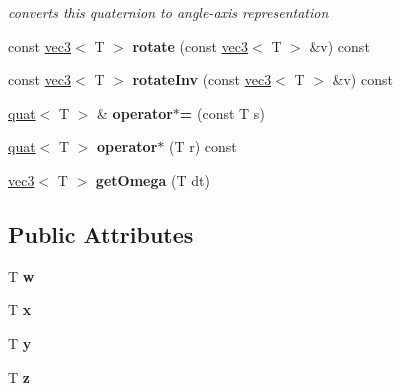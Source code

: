 \begin{DoxyCompactItemize}
\begin{DoxyCompactList}\small\item\em converts this quaternion to angle-\/axis representation \item\end{DoxyCompactList}\item 
\hypertarget{classmath_1_1quat_a2435a22376cf5c74aa3e9bf45cbfb0be}{
const \hyperlink{classmath_1_1vec3}{vec3}$<$ T $>$ {\bfseries rotate} (const \hyperlink{classmath_1_1vec3}{vec3}$<$ T $>$ \&v) const }
\label{classmath_1_1quat_a2435a22376cf5c74aa3e9bf45cbfb0be}

\item 
\hypertarget{classmath_1_1quat_ad8945faa17ebc4eb51175015336fb090}{
const \hyperlink{classmath_1_1vec3}{vec3}$<$ T $>$ {\bfseries rotateInv} (const \hyperlink{classmath_1_1vec3}{vec3}$<$ T $>$ \&v) const }
\label{classmath_1_1quat_ad8945faa17ebc4eb51175015336fb090}

\item 
\hypertarget{classmath_1_1quat_a4000ef6a410644de9ceb2173ecec0c10}{
\hyperlink{classmath_1_1quat}{quat}$<$ T $>$ \& {\bfseries operator$\ast$=} (const T s)}
\label{classmath_1_1quat_a4000ef6a410644de9ceb2173ecec0c10}

\item 
\hypertarget{classmath_1_1quat_ac2d729a5ae4a0f174ca48c380ec0b3a9}{
\hyperlink{classmath_1_1quat}{quat}$<$ T $>$ {\bfseries operator$\ast$} (T r) const }
\label{classmath_1_1quat_ac2d729a5ae4a0f174ca48c380ec0b3a9}

\item 
\hypertarget{classmath_1_1quat_a86bc81aaca830d5f1b48abf3b6ea2d65}{
\hyperlink{classmath_1_1vec3}{vec3}$<$ T $>$ {\bfseries getOmega} (T dt)}
\label{classmath_1_1quat_a86bc81aaca830d5f1b48abf3b6ea2d65}

\end{DoxyCompactItemize}
\subsection*{Public Attributes}
\begin{DoxyCompactItemize}
\item 
\hypertarget{classmath_1_1quat_a3360a02faef7fc2d651e869fb93a5da3}{
T {\bfseries w}}
\label{classmath_1_1quat_a3360a02faef7fc2d651e869fb93a5da3}

\item 
\hypertarget{classmath_1_1quat_ad0499c45096e2d9959223f8ea40fdf89}{
T {\bfseries x}}
\label{classmath_1_1quat_ad0499c45096e2d9959223f8ea40fdf89}

\item 
\hypertarget{classmath_1_1quat_a53b91f2b4131a20e371481d820977654}{
T {\bfseries y}}
\label{classmath_1_1quat_a53b91f2b4131a20e371481d820977654}

\item 
\hypertarget{classmath_1_1quat_aaa55d4e696355a19234af1c557840f75}{
T {\bfseries z}}
\label{classmath_1_1quat_aaa55d4e696355a19234af1c557840f75}

\end{DoxyCompactItemize}
